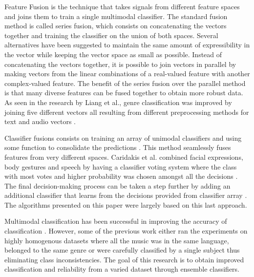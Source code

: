 Feature Fusion is the technique that takes signals from different 
feature spaces and joins them to train a single multimodal classifier. The standard 
fusion method is called series fusion, which consists on concatenating the vectors 
together and training the classifier on the union of both spaces. Several alternatives 
have been suggested to maintain the same amount of expressibility in the vector while 
keeping the vector space as small as possible. Instead of concatenating the vectors 
together, it is possible to join vectors in parallel \cite{yang2003feature} by making vectors from the linear
combinations of a real-valued feature with another complex-valued feature. The benefit 
of the series fusion over the parallel method is that many diverse features can be fused
together to obtain more robust data. As seen in the research by Liang et al., 
genre classification was improved by joining five different vectors all resulting from 
different preprocessing methods for text and audio vectors \cite{liang2011music}. 

Classifier fusions consists on training an array of unimodal classifiers and using some 
function to consolidate the predictions \cite{ahmadian2013multi}. This method seamlessly fuses features 
from very different spaces. Caridakis et al. combined facial expressions, body gestures 
and speech by having a classifier voting system where the class with most votes and 
higher probability was chosen amongst all the decisions \cite{caridakis2007multimodal}. The final decision-making 
process can be taken a step further by adding an additional classifier that learns from 
the decisions provided from classifier array \cite{li2008multi}.  The algorithms presented on this 
paper were largely based on this last approach. 


Multimodal classification has been successful in improving the accuracy of classification 
\cite{hu2010improving} \cite{zhonga2012music}.  However, some of the previous work either ran the experiments on highly homogenous 
datasets where all the music was in the same language, belonged to the same genre or 
were carefully classified by a single subject thus eliminating class inconsistencies.  The goal of 
this research is to obtain improved classification and reliability from a varied dataset 
through ensemble classifiers. 


